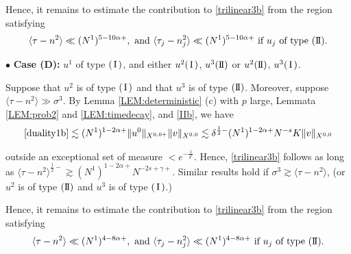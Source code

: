 \documentclass[11pt]{amsart}
\numberwithin{equation}{section} \numberwithin{theorem}{section}
\begin{document}
Hence, it remains to estimate the contribution to \eqref{trilinear3b}
from the region satisfying
\begin{equation}
	\label{caseBb} {\langle {\tau - n^2} \rangle} \ll (N^1)^{5 - 10{\alpha}+}, \text{ and } {\langle {\tau_j - n_j^2} \rangle} \ll (N^1)^{5 - 10{\alpha}+} \text{ if } u_j \text{ of type }({\text{I \hspace{-2.8mm} I} }). 
\end{equation}

\medskip

{
\noindent} $\bullet$ {\bf Case (D):} $u^1$ of type $({\hspace{0.5mm}\text{I}\hspace{0.5mm}})$, and either $u^2({\hspace{0.5mm}\text{I}\hspace{0.5mm}})$, $u^3({\text{I \hspace{-2.8mm} I} })$ or $u^2({\text{I \hspace{-2.8mm} I} })$, $u^3({\hspace{0.5mm}\text{I}\hspace{0.5mm}})$.

Suppose that $u^2$ is of type $({\hspace{0.5mm}\text{I}\hspace{0.5mm}})$ and that $u^3$ is of type $({\text{I \hspace{-2.8mm} I} })$. Moreover, suppose ${\langle {\tau - n^2} \rangle} \gg {\sigma}^3$. 
By Lemma \ref{LEM:deterministic} (c) with $p$ large, 
 Lemmata \ref{LEM:prob2} and \ref{LEM:timedecay}, and \eqref{IIb}, we have 
\begin{align*}
	\eqref{duality1b} 
	 \lesssim (N^1)^{1-2{\alpha}+}\|u^0\|_{X^{0, 0+}}\|v\|_{X^{0, 0}} 
	\lesssim {\delta}^{\frac{1}{2}-} (N^1)^{1-2{\alpha}+}N^{-s}K\|v\|_{X^{0, 0}} 
\end{align*}

{
\noindent} outside an exceptional set of measure $<e^{-\frac{1}{{\delta}^c}}$. Hence, \eqref{trilinear3b} follows as long as ${\langle {\tau - n^2} \rangle}^{\frac{1}{2}-} \gtrsim (N^1)^{1 - 2{\alpha}+}N^{-2s +{\gamma}+}$. Similar results hold if ${\sigma}^3 \gtrsim {\langle {\tau-n^2} \rangle}$, (or $u^2$ is of type $({\text{I \hspace{-2.8mm} I} })$ and $u^3$ is of type $({\hspace{0.5mm}\text{I}\hspace{0.5mm}})$.) 

Hence, it remains to estimate the contribution to \eqref{trilinear3b}
from the region satisfying
\begin{equation}
	\label{caseCb} {\langle {\tau - n^2} \rangle} \ll (N^1)^{4 - 8{\alpha}+}, \text{ and } {\langle {\tau_j - n_j^2} \rangle} \ll (N^1)^{4 - 8{\alpha}+} \text{ if } u_j \text{ of type }({\text{I \hspace{-2.8mm} I} }). 
\end{equation}
\end{document}
